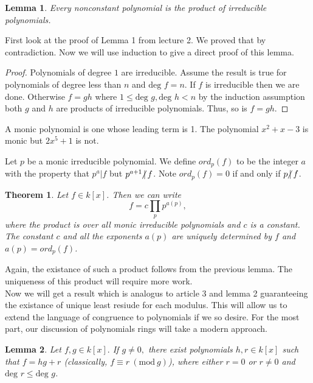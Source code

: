 \documentclass{article}
\theoremstyle{problemstyle}
\newtheorem{theorem}{Theorem}
\newtheorem{lemma}{Lemma}
\newcommand{\Mod}[1]{\ (\mathrm{mod}\ #1)}
\newcommand{\ndiv}{\hspace{-4pt}\not|\hspace{2pt}}
\begin{document}
\begin{lemma}
Every nonconstant polynomial is the product of irreducible polynomials. 
\end{lemma}

First look at the proof of Lemma 1 from lecture 2. We proved that by contradiction. Now we will use induction to give a direct proof of this lemma. 

\begin{proof}
Polynomials of degree $1$ are irreducible. Assume the result is true for polynomials of degree less than $n$ and $\text{deg } f = n$. If $f$ is irreducible then we are done. Otherwise $f = gh$ where $1 \leq \text{deg } g, \text{deg } h < n$ by the induction assumption both $g$ and $h$ are products of irreducible polynomials. Thus, so is $f = gh$. 
\end{proof}

A monic polynomial is one whose leading term is 1.  The polynomial $x^2 + x -3$ is monic but $2x^5+1$ is not. 

Let $p$ be a monic irreducible polynomial. We define $ord_p(f)$ to be the integer $a$ with the property that $p^a|f$ but $p^{a+1}\ndiv f$. Note $ord_p(f) = 0$ if and only if $p\ndiv f$. 

\setcounter{theorem}{1}
\begin{theorem}
Let $f \in k[x]$. Then we can write $$f = c\prod_pp^{a(p)},$$ where the product is over all monic irreducible polynomials and $c$ is a constant. The constant $c$ and all the exponents $a(p)$ are uniquely determined by $f$ and $a(p) = ord_p(f)$.
\end{theorem}

Again, the existance of such a product follows from the previous lemma. The uniqueness of this product will require more work.\\ 

Now we will get a result which is analogus to article 3 and lemma 2 guaranteeing the existance of unique least resiude for each modulus. This will allow us to extend the language of congruence to polynomials if we so desire. For the most part, our discussion of polynomials rings will take a modern approach. 

\begin{lemma}
Let $f,g \in k[x].$ If $g \neq 0,$ there exist polynomials $h,r \in k[x]$ such that $f = hg + r$ (classically, $f \equiv r \Mod{g}$), where either $r = 0$ or $r \neq 0$ and $\text{deg } r \leq \text{deg } g$.  
\end{lemma}
\end{document}
